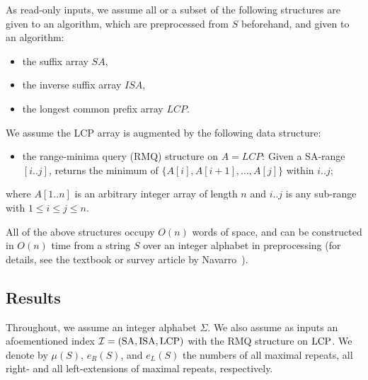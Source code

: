 \documentclass{article}
\begin{document}
As read-only inputs, we assume all or a subset of the following structures are given to an algorithm, which are preprocessed from $S$ beforehand, and given to an algorithm:
\begin{itemize}
\item the suffix array $SA$,
\item the inverse suffix array $ISA$,
\item the longest common prefix array $LCP$.
\end{itemize}
We assume the LCP array is augmented by the following data structure: 
\begin{itemize}
\item the range-minima query (RMQ) structure on $A = LCP$: Given a SA-range $[i..j]$, returns the minimum of $\{A[i], A[i+1], \dots, A[j]\}$ within $i..j$; 
  
\end{itemize}
where $A[1..n]$ is an arbitrary integer array of length $n$ and $i..j$ is any sub-range with $1\le i\le j\le n$. 

All of the above structures occupy $O(n)$ words of space, and can be constructed in $O(n)$ time from a string $S$ over an integer alphabet in preprocessing (for details, see the textbook or survey article by Navarro~\cite{navarro2016cds:book,navarro2021indexing:ii}).

\subsection{Results}
Throughout, we assume an integer alphabet $\Sigma$.
We also assume as inputs an afoementioned index $\mathcal{I} = (\mathrm{SA}, \mathrm{ISA}, \mathrm{LCP})$ with the RMQ structure on $\mathrm{LCP}$.  We denote by $\mu(S)$, $e_R(S)$, and $e_L(S)$ the numbers of all maximal repeats, all right- and all left-extensions of maximal repeats, respectively.

\end{document}
